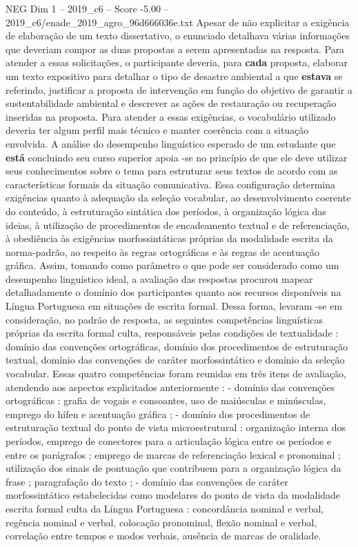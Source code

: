 \begin{textsample}{NEG Dim 1 – 2019\_c6 – Score -5.00 – 2019\_c6/enade\_2019\_agro\_96d666036e.txt}
Apesar de não explicitar a exigência de elaboração de um texto dissertativo, o enunciado detalhava várias informações que deveriam compor as duas propostas a serem apresentadas na resposta.
Para atender a essas solicitações, o participante deveria, para \textbf{cada} proposta, elaborar um texto expositivo para detalhar o tipo de desastre ambiental a que \textbf{estava} se referindo, justificar a proposta de intervenção em função do objetivo de garantir a sustentabilidade ambiental e descrever as ações de restauração ou recuperação inseridas na proposta.
Para atender a essas exigências, o vocabulário utilizado deveria ter algum perfil mais técnico e manter coerência com a situação envolvida.
A análise do desempenho linguístico esperado de um estudante que \textbf{está} concluindo seu curso superior apoia -se no princípio de que ele deve utilizar seus conhecimentos sobre o tema para estruturar seus textos de acordo com as características formais da situação comunicativa.
Essa configuração determina exigências quanto à adequação da seleção vocabular, ao desenvolvimento coerente do conteúdo, à estruturação sintática dos períodos, à organização lógica das ideias, à utilização de procedimentos de encadeamento textual e de referenciação, à obediência às exigências morfossintáticas próprias da modalidade escrita da norma-padrão, ao respeito às regras ortográficas e às regras de acentuação gráfica.
Assim, tomando como parâmetro o que pode ser considerado como um desempenho linguístico ideal, a avaliação das respostas procurou mapear detalhadamente o domínio dos participantes quanto aos recursos disponíveis na Língua Portuguesa em situações de escrita formal.
Dessa forma, levaram -se em consideração, no padrão de resposta, as seguintes competências linguísticas próprias da escrita formal culta, responsáveis pelas condições de textualidade : domínio das convenções ortográficas, domínio dos procedimentos de estruturação textual, domínio das convenções de caráter morfossintático e domínio da seleção vocabular.
Essas quatro competências foram reunidas em três itens de avaliação, atendendo aos aspectos explicitados anteriormente : - domínio das convenções ortográficas : grafia de vogais e consoantes, uso de maiúsculas e minúsculas, emprego do hífen e acentuação gráfica ; - domínio dos procedimentos de estruturação textual do ponto de vista microestrutural : organização interna dos períodos, emprego de conectores para a articulação lógica entre os períodos e entre os parágrafos ; emprego de marcas de referenciação lexical e pronominal ; utilização dos sinais de pontuação que contribuem para a organização lógica da frase ; paragrafação do texto ; - domínio das convenções de caráter morfossintático estabelecidas como modelares do ponto de vista da modalidade escrita formal culta da Língua Portuguesa : concordância nominal e verbal, regência nominal e verbal, colocação pronominal, flexão nominal e verbal, correlação entre tempos e modos verbais, ausência de marcas de oralidade.

\end{textsample}
